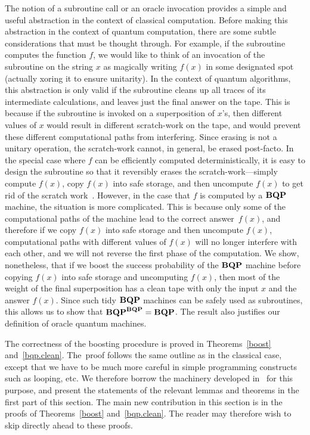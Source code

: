 The notion of a subroutine call or an oracle invocation provides a simple and
useful abstraction in the context of classical computation. Before making
this abstraction in the context of quantum computation, there are some
subtle considerations that must be thought through. For example, if the
subroutine computes the function $f$, we would like to think of an invocation
of the subroutine on the string $x$ as magically writing $f(x)$ in some
designated spot (actually xoring it to ensure unitarity). In the context of
quantum algorithms, this abstraction is only valid if the subroutine cleans up
all traces of its intermediate calculations, and leaves just the final answer
on the tape. This is because if the subroutine is invoked on a superposition of
$x$'s, then different values of $x$ would result in different scratch-work on
the tape, and would prevent these different computational paths from
interfering. Since erasing is not a unitary operation, the scratch-work
cannot, in general, be erased post-facto. In the special case where $f$ can be
efficiently computed deterministically, it is easy to design the subroutine so
that it reversibly erases the scratch-work---simply compute
$f(x)$, copy $f(x)$ into safe storage, and then uncompute $f(x)$ to get rid of
the scratch work~\cite{oldbennett}. However, in the case that $f$ is computed
by a $\mbox{\bf BQP}$ machine, the situation is more complicated. This is because only
some of the computational paths of the machine lead to the correct
answer~$f(x)$, and therefore if we copy $f(x)$ into safe storage and then
uncompute $f(x)$, computational paths with different values of $f(x)$ will no
longer interfere with each other, and we will not reverse the first phase of
the computation. We show, nonetheless, that if we boost the success probability
of the $\mbox{\bf BQP}$ machine before copying $f(x)$ into safe storage and uncomputing
$f(x)$, then most of the weight of the final superposition has a clean tape
with only the input $x$ and the answer $f(x)$. Since such tidy $\mbox{\bf BQP}$ machines
can be safely used as subroutines, this allows us to show that
$\mbox{\bf BQP}^{\mbox{\scriptsize\bf BQP}} = \mbox{\bf BQP}$. The result also justifies our definition of
oracle quantum machines.

The correctness of the boosting procedure is proved in
Theorems~\ref{boost} and~\ref{bqp.clean}. The~proof follows the same outline as
in the classical case, except that we have to be much more careful in simple
programming constructs such as looping, etc. We therefore borrow the machinery
developed in~\cite{BV} for this purpose, and present the statements of the
relevant lemmas and theorems in the first part of this section. The main new
contribution in this section is in the proofs of Theorems~\ref{boost}
and~\ref{bqp.clean}. The reader may therefore wish to skip directly ahead to
these proofs.

